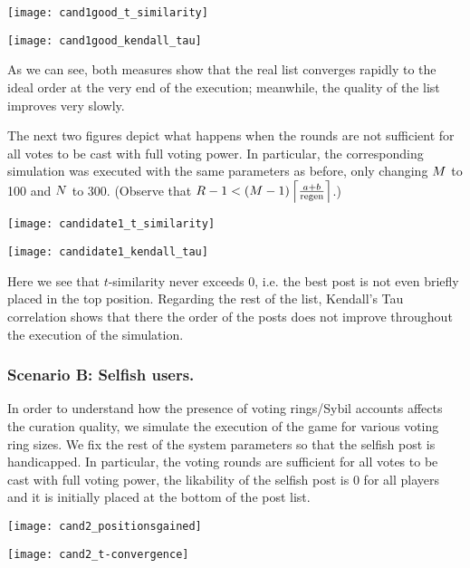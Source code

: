       \texttt{[image: cand1good\_t\_similarity]}

      \texttt{[image: cand1good\_kendall\_tau]}

      As we can see, both measures show that the real list converges rapidly to
      the ideal order at the very end of the execution;  meanwhile, the
      quality of the list improves very slowly.

      The next two figures depict what happens when the rounds are not
      sufficient for all votes to be cast with full voting power. In particular,
      the corresponding simulation was executed with the same parameters as
      before, only changing $\postlen$ to 100 and $\playerlen$ to 300. (Observe
      that $\rounds - 1 < \left(\postlen - 1\right)\ceil*{\frac{a +
      b}{\regen}}$.)

      \texttt{[image: candidate1\_t\_similarity]}

      \texttt{[image: candidate1\_kendall\_tau]}

      Here we see that $t$-similarity never exceeds 0, i.e. the best post is not
      even briefly placed in the top position. Regarding the rest of the list,
      Kendall's Tau correlation shows that there the order of the posts does not
      improve throughout the execution of the simulation.


    \subsubsection{Scenario B: Selfish users.}
      In order to understand how the presence of voting rings/Sybil accounts
      affects the curation quality, we simulate the execution of the game for
      various voting ring sizes. We fix the rest of the system parameters so
      that the selfish post is handicapped. In particular, the voting rounds are
      sufficient for all votes to be cast with full voting power, the likability
      of the selfish post is 0 for all players and it is initially placed at the
      bottom of the post list.

      \texttt{[image: cand2\_positionsgained]}

      \texttt{[image: cand2\_t-convergence]}
